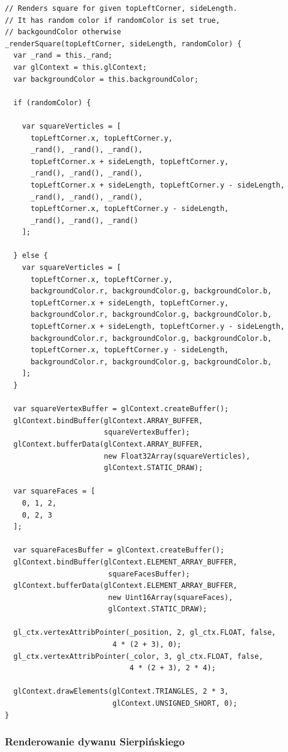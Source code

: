 \documentclass[a4paper,11pt]{article}
\begin{document}
\begin{lstlisting}[caption=Realizacja funkcji renderującej pojedyńczy kwadrat]
// Renders square for given topLeftCorner, sideLength. 
// It has random color if randomColor is set true, 
// backgoundColor otherwise 
_renderSquare(topLeftCorner, sideLength, randomColor) {
  var _rand = this._rand;
  var glContext = this.glContext;
  var backgroundColor = this.backgroundColor;

  if (randomColor) {

    var squareVerticles = [
      topLeftCorner.x, topLeftCorner.y,
      _rand(), _rand(), _rand(),
      topLeftCorner.x + sideLength, topLeftCorner.y,
      _rand(), _rand(), _rand(),
      topLeftCorner.x + sideLength, topLeftCorner.y - sideLength,
      _rand(), _rand(), _rand(),
      topLeftCorner.x, topLeftCorner.y - sideLength,
      _rand(), _rand(), _rand()
    ];

  } else {
    var squareVerticles = [
      topLeftCorner.x, topLeftCorner.y,
      backgroundColor.r, backgroundColor.g, backgroundColor.b,
      topLeftCorner.x + sideLength, topLeftCorner.y,
      backgroundColor.r, backgroundColor.g, backgroundColor.b,
      topLeftCorner.x + sideLength, topLeftCorner.y - sideLength,
      backgroundColor.r, backgroundColor.g, backgroundColor.b,
      topLeftCorner.x, topLeftCorner.y - sideLength,
      backgroundColor.r, backgroundColor.g, backgroundColor.b,
    ];
  }

  var squareVertexBuffer = glContext.createBuffer();
  glContext.bindBuffer(glContext.ARRAY_BUFFER,
					   squareVertexBuffer);
  glContext.bufferData(glContext.ARRAY_BUFFER, 
					   new Float32Array(squareVerticles), 
				   	   glContext.STATIC_DRAW);

  var squareFaces = [
    0, 1, 2,
    0, 2, 3
  ];

  var squareFacesBuffer = glContext.createBuffer();
  glContext.bindBuffer(glContext.ELEMENT_ARRAY_BUFFER,
					    squareFacesBuffer);
  glContext.bufferData(glContext.ELEMENT_ARRAY_BUFFER, 
					    new Uint16Array(squareFaces), 
					    glContext.STATIC_DRAW);

  gl_ctx.vertexAttribPointer(_position, 2, gl_ctx.FLOAT, false, 
					   	 4 * (2 + 3), 0);
  gl_ctx.vertexAttribPointer(_color, 3, gl_ctx.FLOAT, false, 
					         4 * (2 + 3), 2 * 4);

  glContext.drawElements(glContext.TRIANGLES, 2 * 3, 
					     glContext.UNSIGNED_SHORT, 0);
}
\end{lstlisting}
\newpage
\subsubsection{Renderowanie dywanu Sierpińskiego}
\end{document}
